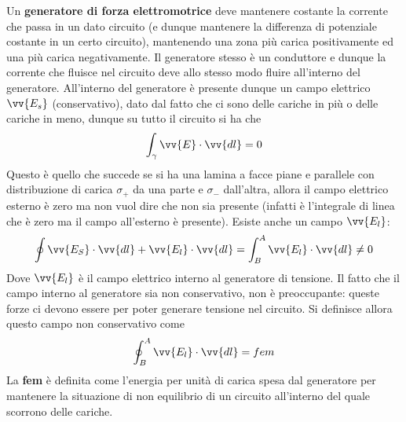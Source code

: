 \documentclass[a4paper, oneside]{article}
\begin{document}
Un \textbf{generatore di forza elettromotrice} deve mantenere costante
la corrente che passa in un dato circuito (e dunque mantenere la 
differenza di potenziale costante in un certo circuito), mantenendo una 
zona più carica positivamente ed una più carica negativamente. Il generatore stesso
è un conduttore e dunque la corrente che fluisce nel circuito deve allo stesso modo fluire all'interno del
generatore. All'interno del generatore è presente dunque un campo elettrico $\vv{E_s}$ (conservativo), 
dato dal fatto che ci sono delle cariche in più o delle cariche in meno, dunque 
su tutto il circuito si ha che
\begin{gather*}
    \int_{\gamma} \vv{E} \cdot \vv{dl} = 0   
\end{gather*} 
Questo è quello che succede se si ha una lamina a facce piane e parallele
con distribuzione di carica $\sigma_+$ da una parte e $\sigma_-$ dall'altra,
allora il campo elettrico esterno è zero ma non vuol dire che non sia presente 
(infatti è l'integrale di linea che è zero ma il campo all'esterno è presente).
Esiste anche un campo $\vv{E_l}$:
\begin{gather*}
    \oint \vv{E_S} \cdot \vv{dl} + \vv{E_l} \cdot \vv{dl} = \int_{B}^{A} \vv{E_l} \cdot \vv{dl} \neq 0       
\end{gather*} 
Dove $\vv{E_l}$ è il campo elettrico interno al generatore di tensione. Il fatto che il 
campo interno al generatore sia non conservativo, non è preoccupante: queste forze ci devono essere per poter generare tensione
nel circuito. Si definisce allora questo campo non conservativo come 
\begin{align}
    \oint_{B}^{A}\vv{E_l} \cdot \vv{dl} = fem  
\end{align} 
La \textbf{fem} è definita come l'energia per unità di carica spesa 
dal generatore per mantenere la situazione di non equilibrio di un 
circuito all'interno del quale scorrono delle cariche.
\end{document}
